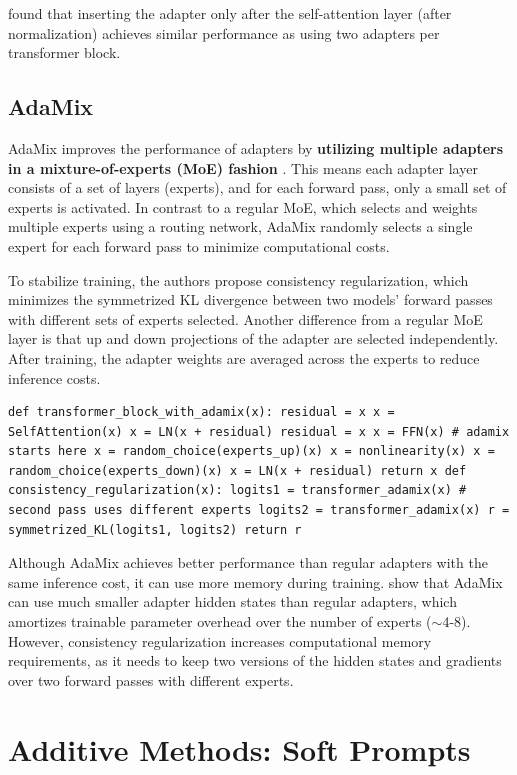 \citet{adapter_fusion} found that inserting the adapter only after the self-attention layer (after normalization) achieves similar performance as using two adapters per transformer block. 

\subsection{AdaMix}

AdaMix \citep{adamix} improves the performance of adapters by \textbf{utilizing multiple adapters in a mixture-of-experts (MoE) fashion} \citep{moe}. This means each adapter layer consists of a set of layers (experts), and for each forward pass, only a small set of experts is activated. In contrast to a regular MoE, which selects and weights multiple experts using a routing network, AdaMix randomly selects a single expert for each forward pass to minimize computational costs.

To stabilize training, the authors propose consistency regularization, which minimizes the symmetrized KL divergence between two models' forward passes with different sets of experts selected. Another difference from a regular MoE layer is that up and down projections of the adapter are selected independently. After training, the adapter weights are averaged across the experts to reduce inference costs.

\begin{lstlisting}
def transformer_block_with_adamix(x): residual = x x = SelfAttention(x) x = LN(x + residual) residual = x x = FFN(x) # adamix starts here x = random_choice(experts_up)(x) x = nonlinearity(x) x = random_choice(experts_down)(x) x = LN(x + residual) return x def consistency_regularization(x): logits1 = transformer_adamix(x) # second pass uses different experts logits2 = transformer_adamix(x) r = symmetrized_KL(logits1, logits2) return r
\end{lstlisting}

Although AdaMix achieves better performance than regular adapters with the same inference cost, it can use more memory during training. \citet{adamix} show that AdaMix can use much smaller adapter hidden states than regular adapters, which amortizes trainable parameter overhead over the number of experts ($\sim$4-8). However, consistency regularization increases computational memory requirements, as it needs to keep two versions of the hidden states and gradients over two forward passes with different experts.

\section{Additive Methods: Soft Prompts}
\label{sec:additive_section_soft_prompts}

